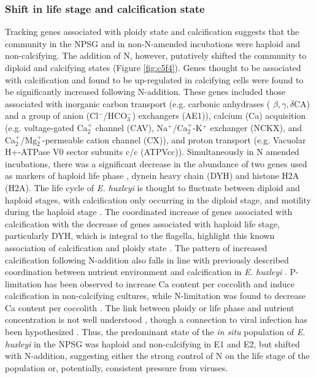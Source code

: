 \subsubsection{Shift in life stage and calcification state}

Tracking genes associated with ploidy state and calcification suggests that the community in the NPSG and in non-N-amended incubations were haploid and non-calcifying. The addition of N, however, putatively shifted the community to diploid and calcifying states (Figure \ref{fig:c5f4}). Genes thought to be associated with calcification \citep{Mackinder2010} and found to be up-regulated in calcifying cells \citep{Mackinder2011} were found to be significantly increased following N-addition. These genes included those associated with inorganic carbon transport (e.g. carbonic anhydrases ( $\beta, \gamma, \delta$CA) and a group of anion (Cl$^-$/HCO$_{3}^-$) exchangers (AE1)), calcium (Ca) acquisition (e.g. voltage-gated Ca$_{2}^+$ channel (CAV), Na$^+$/Ca$_{2}^+$-K$^+$ exchanger (NCKX), and Ca$_{2}^+$/Mg$_{2}^+$-permeable cation channel (CX)), and proton transport (e.g. Vacuolar H+-ATPase V0 sector subunits c/c (ATPVcc)). Simultaneously in N amended incubations, there was a significant decrease in the abundance of two genes used as markers of haploid life phase \citep{Frada2012}, dynein heavy chain (DYH) and histone H2A (H2A). The life cycle of \textit{E. huxleyi} is thought to fluctuate between diploid and haploid stages, with calcification only occurring in the diploid stage, and motility during the haploid stage \citep{Paasche2001}. The coordinated increase of genes associated with calcification with the decrease of genes associated with haploid life stage, particularly DYH, which is integral to the flagella, highlight this known association of calcification and ploidy state \citep{Frada2012}. The pattern of increased calcification following N-addition also falls in line with previously described coordination between nutrient environment and calcification in \textit{E. huxleyi} \citep{Paasche2001}. P-limitation has been observed to increase Ca content per coccolith and induce calcification in non-calcifying cultures, while N-limitation was found to decrease Ca content per coccolith \citep{Paasche1994, Paasche1998}. The link between ploidy or life phase and nutrient concentration is not well understood \citep{Green1996}, though a connection to viral infection has been hypothesized \citep{Frada2008}. Thus, the predominant state of the \textit{in situ} population of \textit{E. huxleyi} in the NPSG was haploid and non-calcifying in E1 and E2, but shifted with N-addition, suggesting either the strong control of N on the life stage of the population or, potentially, consistent pressure from viruses. 

